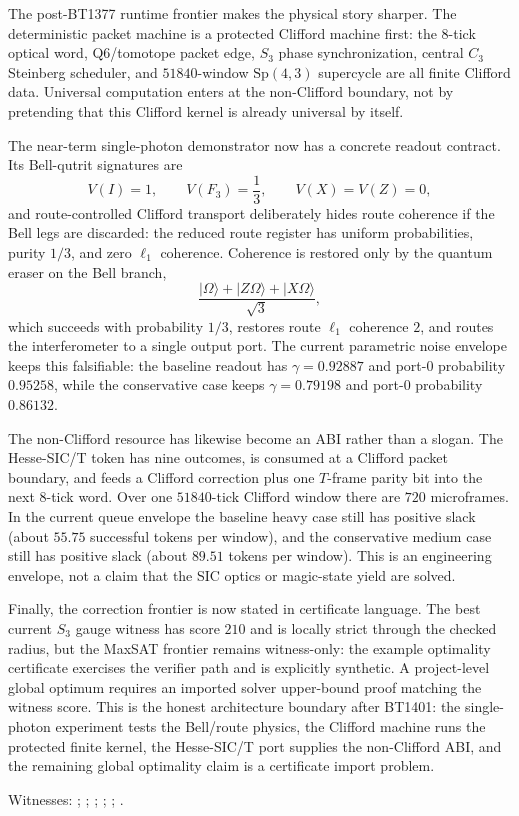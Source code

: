 \documentclass[11pt]{article}
\newcommand{\ket}[1]{|#1\rangle}
\begin{document}
The post-BT1377 runtime frontier makes the physical story sharper.  The
deterministic packet machine is a protected Clifford machine first: the
8-tick optical word, Q6/tomotope packet edge, $S_3$ phase synchronization,
central $C_3$ Steinberg scheduler, and $51840$-window
$\mathrm{Sp}(4,3)$ supercycle are all finite Clifford data.  Universal
computation enters at the non-Clifford boundary, not by pretending that this
Clifford kernel is already universal by itself.

The near-term single-photon demonstrator now has a concrete readout contract.
Its Bell-qutrit signatures are
\[
  V(I)=1,\qquad V(F_3)=\frac13,\qquad V(X)=V(Z)=0,
\]
and route-controlled Clifford transport deliberately hides route coherence if
the Bell legs are discarded: the reduced route register has uniform
probabilities, purity $1/3$, and zero $\ell_1$ coherence.  Coherence is restored
only by the quantum eraser on the Bell branch,
\[
  \frac{\ket{\Omega}+\ket{Z\Omega}+\ket{X\Omega}}{\sqrt3},
\]
which succeeds with probability $1/3$, restores route $\ell_1$ coherence $2$,
and routes the interferometer to a single output port.  The current parametric
noise envelope keeps this falsifiable: the baseline readout has
$\gamma=0.92887$ and port-$0$ probability $0.95258$, while the conservative
case keeps $\gamma=0.79198$ and port-$0$ probability $0.86132$.

The non-Clifford resource has likewise become an ABI rather than a slogan.  The
Hesse-SIC/T token has nine outcomes, is consumed at a Clifford packet boundary,
and feeds a Clifford correction plus one $T$-frame parity bit into the next
8-tick word.  Over one $51840$-tick Clifford window there are $720$
microframes.  In the current queue envelope the baseline heavy case still has
positive slack (about $55.75$ successful tokens per window), and the
conservative medium case still has positive slack (about $89.51$ tokens per
window).  This is an engineering envelope, not a claim that the SIC optics or
magic-state yield are solved.

Finally, the correction frontier is now stated in certificate language.  The
best current $S_3$ gauge witness has score $210$ and is locally strict through
the checked radius, but the MaxSAT frontier remains witness-only: the example
optimality certificate exercises the verifier path and is explicitly synthetic.
A project-level global optimum requires an imported solver upper-bound proof
matching the witness score.  This is the honest architecture boundary after
BT1401: the single-photon experiment tests the Bell/route physics, the Clifford
machine runs the protected finite kernel, the Hesse-SIC/T port supplies the
non-Clifford ABI, and the remaining global optimality claim is a certificate
import problem.
\begin{flushleft}
\footnotesize Witnesses:
;
;
;
;
;
.
\end{flushleft}
\end{document}
